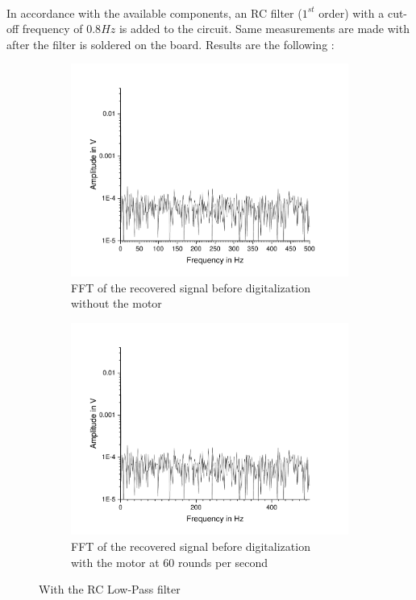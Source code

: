 \documentclass{article}[12pt]
\begin{document}
\paragraph{}
In accordance with the available components, an RC filter ($1^{st}$ order) with a cut-off frequency of $0.8Hz$ is added to the circuit. Same measurements are made with after the filter is soldered on the board. Results are the following : 
\begin{figure}[H]
\centering
\begin{subfigure}{.5\textwidth}
  \centering
  \includegraphics[width=\linewidth]{figures/nomotorfilter.pdf}
  \caption{FFT of the recovered signal before digitalization\\ without the motor}
  \label{fig:nomotornofilter2}
\end{subfigure}%
\begin{subfigure}{.5\textwidth}
  \centering
  \includegraphics[width=\linewidth]{figures/motorfilter.pdf}
  \caption{FFT of the recovered signal before digitalization\\ with the motor at 60 rounds per second}
  \label{fig:motornofilter2}
\end{subfigure}
\caption{With the RC Low-Pass filter}
\label{fig:filterFFT}
\end{figure}
\end{document}
